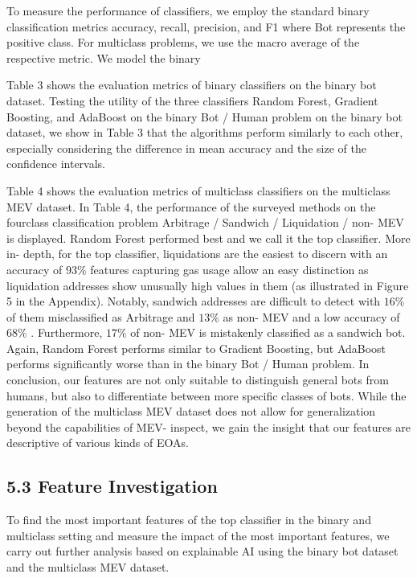 To measure the performance of classifiers, we employ the standard binary classification metrics accuracy, recall, precision, and F1 where Bot represents the positive class. For multiclass problems, we use the macro average of the respective metric. We model the binary

Table 3 shows the evaluation metrics of binary classifiers on the binary bot dataset. Testing the utility of the three classifiers Random Forest, Gradient Boosting, and AdaBoost on the binary Bot / Human problem on the binary bot dataset, we show in Table 3 that the algorithms perform similarly to each other, especially considering the difference in mean accuracy and the size of the confidence intervals.

Table 4 shows the evaluation metrics of multiclass classifiers on the multiclass MEV dataset. In Table 4, the performance of the surveyed methods on the fourclass classification problem Arbitrage / Sandwich / Liquidation / non- MEV is displayed. Random Forest performed best and we call it the top classifier. More in- depth, for the top classifier, liquidations are the easiest to discern with an accuracy of \(93\%\) features capturing gas usage allow an easy distinction as liquidation addresses show unusually high values in them (as illustrated in Figure 5 in the Appendix). Notably, sandwich addresses are difficult to detect with \(16\%\) of them misclassified as Arbitrage and \(13\%\) as non- MEV and a low accuracy of \(68\%\) . Furthermore, \(17\%\) of non- MEV is mistakenly classified as a sandwich bot. Again, Random Forest performs similar to Gradient Boosting, but AdaBoost performs significantly worse than in the binary Bot / Human problem. In conclusion, our features are not only suitable to distinguish general bots from humans, but also to differentiate between more specific classes of bots. While the generation of the multiclass MEV dataset does not allow for generalization beyond the capabilities of MEV- inspect, we gain the insight that our features are descriptive of various kinds of EOAs.

\subsection*{5.3 Feature Investigation}

To find the most important features of the top classifier in the binary and multiclass setting and measure the impact of the most important features, we carry out further analysis based on explainable AI using the binary bot dataset and the multiclass MEV dataset.

